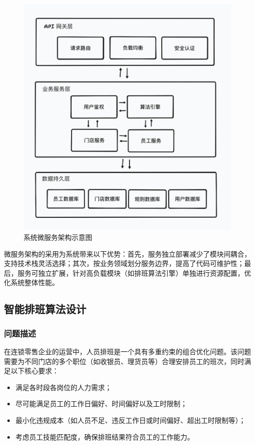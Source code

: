 \documentclass{ctexart}
\begin{document}
\begin{figure}[H]
    \centering
    \includegraphics[width=0.8\linewidth]{./source/微服务架构图.png}
    \caption{系统微服务架构示意图}
    \label{fig:microservice-arch}
\end{figure}

微服务架构的采用为系统带来以下优势：首先，服务独立部署减少了模块间耦合，支持技术栈灵活选择；其次，按业务领域划分服务边界，提高了代码可维护性；最后，服务可独立扩展，针对高负载模块（如排班算法引擎）单独进行资源配置，优化系统整体性能。

\subsection{智能排班算法设计}
\subsubsection{问题描述}

在连锁零售企业的运营中，人员排班是一个具有多重约束的组合优化问题。该问题需要为不同门店的多个职位（如收银员、理货员等）合理安排员工的班次，同时满足以下核心要求：
\begin{itemize}
    \item 满足各时段各岗位的人力需求；
    \item 尽可能满足员工的工作日偏好、时间偏好以及工时限制；
    \item 最小化违规成本（如人员不足、违反工作日或时间偏好、超出工时限制等）；
    \item 考虑员工技能匹配度，确保排班结果符合员工的工作能力。
\end{itemize}
\end{document}
